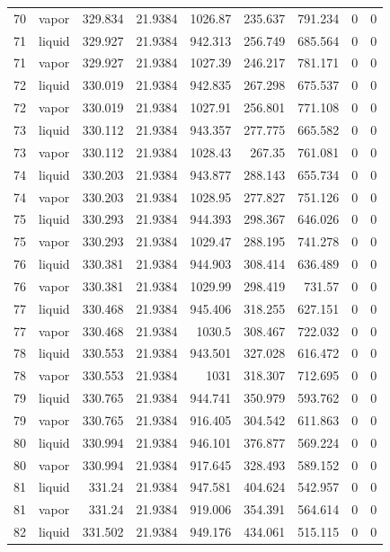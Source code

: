 \begin{longtable}{r l r r r r r r r}
70 & vapor & 329.834 & 21.9384 & 1026.87 & 235.637 & 791.234 & 0 & 0 \\
71 & liquid & 329.927 & 21.9384 & 942.313 & 256.749 & 685.564 & 0 & 0 \\
71 & vapor & 329.927 & 21.9384 & 1027.39 & 246.217 & 781.171 & 0 & 0 \\
72 & liquid & 330.019 & 21.9384 & 942.835 & 267.298 & 675.537 & 0 & 0 \\
72 & vapor & 330.019 & 21.9384 & 1027.91 & 256.801 & 771.108 & 0 & 0 \\
73 & liquid & 330.112 & 21.9384 & 943.357 & 277.775 & 665.582 & 0 & 0 \\
73 & vapor & 330.112 & 21.9384 & 1028.43 & 267.35 & 761.081 & 0 & 0 \\
74 & liquid & 330.203 & 21.9384 & 943.877 & 288.143 & 655.734 & 0 & 0 \\
74 & vapor & 330.203 & 21.9384 & 1028.95 & 277.827 & 751.126 & 0 & 0 \\
75 & liquid & 330.293 & 21.9384 & 944.393 & 298.367 & 646.026 & 0 & 0 \\
75 & vapor & 330.293 & 21.9384 & 1029.47 & 288.195 & 741.278 & 0 & 0 \\
76 & liquid & 330.381 & 21.9384 & 944.903 & 308.414 & 636.489 & 0 & 0 \\
76 & vapor & 330.381 & 21.9384 & 1029.99 & 298.419 & 731.57 & 0 & 0 \\
77 & liquid & 330.468 & 21.9384 & 945.406 & 318.255 & 627.151 & 0 & 0 \\
77 & vapor & 330.468 & 21.9384 & 1030.5 & 308.467 & 722.032 & 0 & 0 \\
78 & liquid & 330.553 & 21.9384 & 943.501 & 327.028 & 616.472 & 0 & 0 \\
78 & vapor & 330.553 & 21.9384 & 1031 & 318.307 & 712.695 & 0 & 0 \\
79 & liquid & 330.765 & 21.9384 & 944.741 & 350.979 & 593.762 & 0 & 0 \\
79 & vapor & 330.765 & 21.9384 & 916.405 & 304.542 & 611.863 & 0 & 0 \\
80 & liquid & 330.994 & 21.9384 & 946.101 & 376.877 & 569.224 & 0 & 0 \\
80 & vapor & 330.994 & 21.9384 & 917.645 & 328.493 & 589.152 & 0 & 0 \\
81 & liquid & 331.24 & 21.9384 & 947.581 & 404.624 & 542.957 & 0 & 0 \\
81 & vapor & 331.24 & 21.9384 & 919.006 & 354.391 & 564.614 & 0 & 0 \\
82 & liquid & 331.502 & 21.9384 & 949.176 & 434.061 & 515.115 & 0 & 0 \\

\end{longtable}
